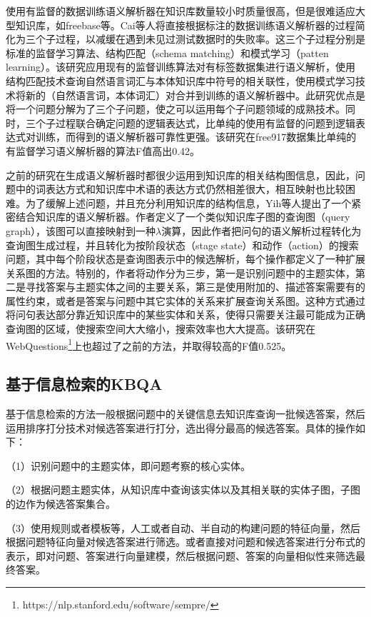 使用有监督的数据训练语义解析器在知识库数量较小时质量很高，但是很难适应大型知识库，如freebase等。Cai\cite{Cai}等人将直接根据标注的数据训练语义解析器的过程简化为三个子过程，以减缓在遇到未见过测试数据时的失败率。这三个子过程分别是标准的监督学习算法、结构匹配（schema matching）和模式学习（patten learning）。该研究应用现有的监督训练算法对有标签数据集进行语义解析，使用结构匹配技术查询自然语言词汇与本体知识库中符号的相关联性，使用模式学习技术将新的（自然语言词，本体词汇）对合并到训练的语义解析器中。此研究优点是将一个问题分解为了三个子问题，使之可以运用每个子问题领域的成熟技术。同时，三个子过程联合确定问题的逻辑表达式，比单纯的使用有监督的问题到逻辑表达式对训练，而得到的语义解析器可靠性更强。该研究在free917数据集比单纯的有监督学习语义解析器的算法F值高出0.42。

之前的研究在生成语义解析器时都很少运用到知识库的相关结构图信息，因此，问题中的词表达方式和知识库中术语的表达方式仍然相差很大，相互映射也比较困难。为了缓解上述问题，并且充分利用知识库的结构信息，Yih\cite{Yih}等人提出了一个紧密结合知识库的语义解析器。作者定义了一个类似知识库子图的查询图（query graph），该图可以直接映射到一种$\lambda$演算，因此作者把问句的语义解析过程转化为查询图生成过程，并且转化为按阶段状态（stage state）和动作（action）的搜索问题，其中每个阶段状态是查询图表示中的候选解析，每个操作都定义了一种扩展关系图的方法。特别的，作者将动作分为三步，第一是识别问题中的主题实体，第二是寻找答案与主题实体之间的主要关系，第三是使用附加的、描述答案需要有的属性约束，或者是答案与问题中其它实体的关系来扩展查询关系图。这种方式通过将问句表达部分靠近知识库中的某些实体和关系，使得只需要关注最可能成为正确查询图的区域，使搜索空间大大缩小，搜索效率也大大提高。该研究在WebQuestions\footnote{https://nlp.stanford.edu/software/sempre/}上也超过了之前的方法，并取得较高的F值0.525。

\subsection{基于信息检索的KBQA}
基于信息检索的方法一般根据问题中的关键信息去知识库查询一批候选答案，然后运用排序打分技术对候选答案进行打分，选出得分最高的候选答案。具体的操作如下：

（1）识别问题中的主题实体，即问题考察的核心实体。

（2）根据问题主题实体，从知识库中查询该实体以及其相关联的实体子图，子图的边作为候选答案集合。

（3）使用规则或者模板等，人工或者自动、半自动的构建问题的特征向量，然后根据问题特征向量对候选答案进行筛选。或者直接对问题和候选答案进行分布式的表示，即对问题、答案进行向量建模，然后根据问题、答案的向量相似性来筛选最终答案。

